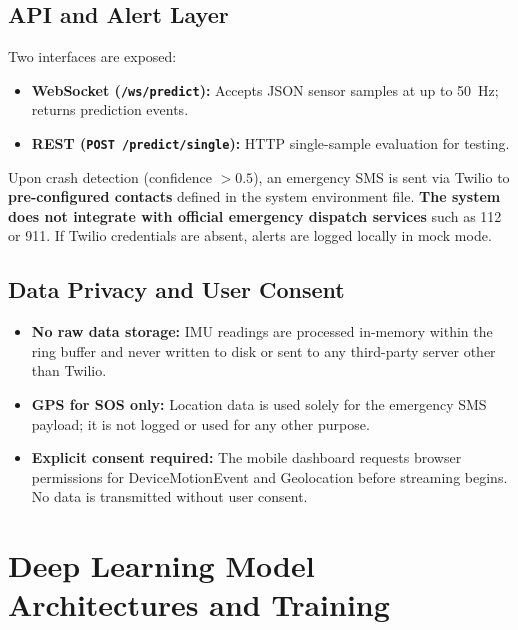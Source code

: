 \documentclass[12pt,a4paper]{article}
\begin{document}
\subsection{API and Alert Layer}

Two interfaces are exposed:
\begin{itemize}
  \item \textbf{WebSocket (\texttt{/ws/predict}):} Accepts JSON sensor
        samples at up to 50~Hz; returns prediction events.
  \item \textbf{REST (\texttt{POST /predict/single}):} HTTP single-sample
        evaluation for testing.
\end{itemize}

Upon crash detection (confidence $>0.5$), an emergency SMS is sent via
Twilio to \textbf{pre-configured contacts} defined in the system environment
file. \textbf{The system does not integrate with official emergency dispatch
services} such as 112 or 911. If Twilio credentials are absent, alerts are
logged locally in mock mode.

\subsection{Data Privacy and User Consent}

\begin{itemize}
  \item \textbf{No raw data storage:} IMU readings are processed in-memory
        within the ring buffer and never written to disk or sent to any
        third-party server other than Twilio.
  \item \textbf{GPS for SOS only:} Location data is used solely for the
        emergency SMS payload; it is not logged or used for any other purpose.
  \item \textbf{Explicit consent required:} The mobile dashboard requests
        browser permissions for DeviceMotionEvent and Geolocation before
        streaming begins. No data is transmitted without user consent.
\end{itemize}

\section{Deep Learning Model Architectures and Training}
\label{sec:models}
\end{document}
